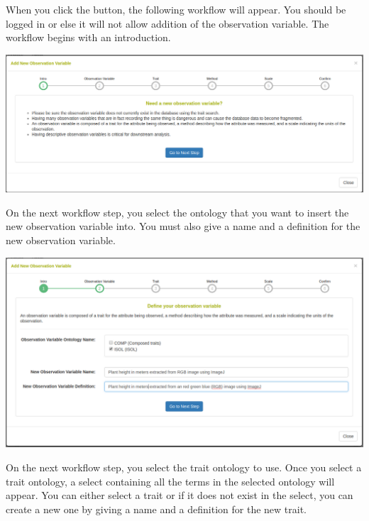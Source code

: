 \documentclass[
  12pt,
]{book}
\begin{document}
When you click the button, the following workflow will appear. You should be logged in or else it will not allow addition of the observation variable. The workflow begins with an introduction.

\begin{center}\includegraphics[width=0.95\linewidth]{assets/images/manage_observation_variables_workflow_intro} \end{center}

On the next workflow step, you select the ontology that you want to insert the new observation variable into. You must also give a name and a definition for the new observation variable.

\begin{center}\includegraphics[width=0.95\linewidth]{assets/images/manage_observation_variables_workflow_observation_variable} \end{center}

On the next workflow step, you select the trait ontology to use. Once you select a trait ontology, a select containing all the terms in the selected ontology will appear. You can either select a trait or if it does not exist in the select, you can create a new one by giving a name and a definition for the new trait.
\end{document}
